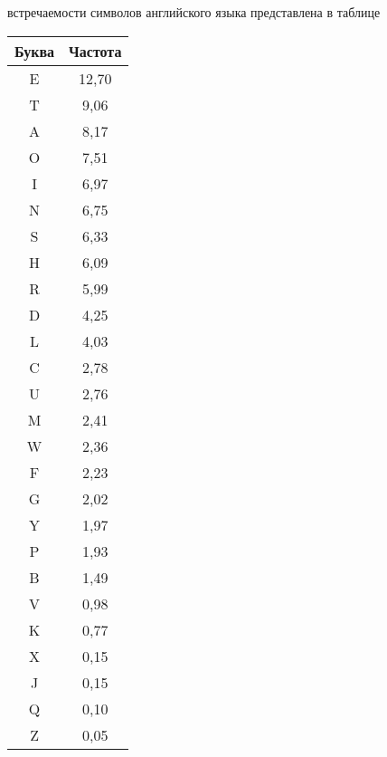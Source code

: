 \documentclass[10pt, a4paper]{article}
\begin{document}
{ встречаемости символов английского языка представлена в таблице


\newpage
\begin{tabular}{|c|c|}
\hline
Буква & Частота \\ \hline
E & 12,70 \\ \hline
T & 9,06 \\ \hline
A & 8,17 \\ \hline
O & 7,51 \\ \hline
I & 6,97 \\ \hline
N & 6,75 \\ \hline
S & 6,33 \\ \hline
H & 6,09 \\ \hline
R & 5,99 \\ \hline
D & 4,25 \\ \hline
L & 4,03 \\ \hline
C & 2,78 \\ \hline
U & 2,76 \\ \hline
M & 2,41 \\ \hline
W & 2,36 \\ \hline
F & 2,23 \\ \hline
G & 2,02 \\ \hline
Y & 1,97 \\ \hline
P & 1,93 \\ \hline
B & 1,49 \\ \hline
V & 0,98 \\ \hline
K & 0,77 \\ \hline
X & 0,15 \\ \hline
J & 0,15 \\ \hline
Q & 0,10 \\ \hline
Z & 0,05 \\ \hline
\end{tabular}
}
\end{document}
